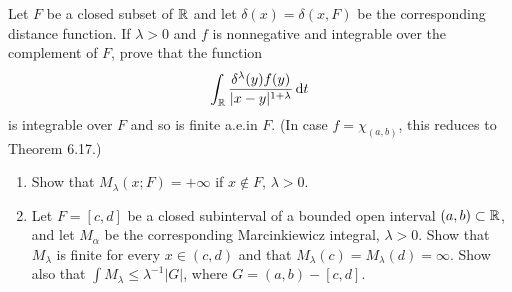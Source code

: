 \begin{problem}
  Let $F$ be a closed subset of $\mathbb{R}$ and let $\delta(x)=\delta(x,F)$ be
  the corresponding distance function. If $\lambda>0$ and $f$ is
  nonnegative and integrable over the complement of $F$, prove that the
  function
  \[
    \int_{\mathbb{R}}\frac{\delta^\lambda(y)f(y)}{|x-y|^{1+\lambda}}\mathop{}\!\mathrm{d} t
  \]
  is integrable over $F$ and so is finite a.e.\@ in $F$. (In case
  $f=\chi_{(a,b)}$, this reduces to Theorem 6.17.)
\end{problem}
\begin{solution}
\end{solution}

\begin{problem}
  \hfill
  \begin{enumerate}[label=(\alph*)]
  \item Show that $M_\lambda(x;F)=+\infty$ if $x\notin F$, $\lambda>0$.
  \item Let $F=[c,d]$ be a closed subinterval of a bounded open interval
    $(a,b)\subset\mathbb{R}$, and let $M_\alpha$ be the corresponding
    Marcinkiewicz integral, $\lambda>0$. Show that $M_\lambda$ is finite
    for every $x\in(c,d)$ and that $M_\lambda(c)=M_\lambda(d)=\infty$. Show
    also that $\int M_\lambda\leq\lambda^{-1}|G|$, where $G=(a,b)-[c,d]$.
  \end{enumerate}
\end{problem}
\begin{solution}
\end{solution}

